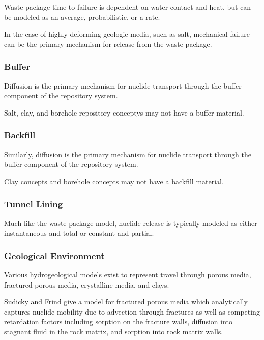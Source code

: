 Waste package time to failure is dependent on water contact and heat, 
but can be modeled as an average, probabilistic, or a rate.

In the case of highly deforming geologic media, such as salt, 
mechanical failure can be the primary mechanism for release from the 
waste package.

\subsubsection{Buffer}
Diffusion is the primary mechanism for nuclide transport through the 
buffer component of the repository system.  

Salt, clay, and borehole repository conceptys may not have a buffer 
material.

\subsubsection{Backfill}
Similarly, diffusion is the primary mechanism for nuclide transport 
through the buffer component of the repository system.

Clay concepts and borehole concepts may not have a backfill material. 

\subsubsection{Tunnel Lining}
Much like the waste package model, nuclide release is typically 
modeled as either instantaneous and total or constant and partial. 

\subsubsection{Geological Environment}
Various hydrogeological models exist to represent travel through 
porous media, fractured porous media, crystalline media, and clays.

Sudicky and Frind give a model for fractured porous media which 
analytically captures nuclide mobility due to advection through 
fractures as well as competing retardation factors including sorption on the 
fracture walls, diffusion into stagnant fluid in the rock matrix, and 
sorption into rock matrix walls. 

